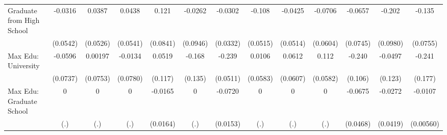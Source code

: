 {\begin{tabular}{l*{12}{c}}
\addlinespace
Graduate from High School&     -0.0316         &      0.0387         &      0.0438         &       0.121         &     -0.0262         &     -0.0302         &      -0.108\sym{*}  &     -0.0425         &     -0.0706         &     -0.0657         &      -0.202\sym{*}  &      -0.135         \\
            &    (0.0542)         &    (0.0526)         &    (0.0541)         &    (0.0841)         &    (0.0946)         &    (0.0332)         &    (0.0515)         &    (0.0514)         &    (0.0604)         &    (0.0745)         &    (0.0980)         &    (0.0755)         \\
\addlinespace
Max Edu: University&     -0.0596         &     0.00197         &     -0.0134         &      0.0519         &      -0.168         &      -0.239\sym{***}&      0.0106         &      0.0612         &       0.112         &      -0.240\sym{*}  &     -0.0497         &      -0.241         \\
            &    (0.0737)         &    (0.0753)         &    (0.0780)         &     (0.117)         &     (0.135)         &    (0.0511)         &    (0.0583)         &    (0.0607)         &    (0.0582)         &     (0.106)         &     (0.123)         &     (0.177)         \\
\addlinespace
Max Edu: Graduate School&           0         &           0         &           0         &     -0.0165         &           0         &     -0.0720\sym{***}&           0         &           0         &           0         &     -0.0675         &     -0.0272         &     -0.0107         \\
            &         (.)         &         (.)         &         (.)         &    (0.0164)         &         (.)         &    (0.0153)         &         (.)         &         (.)         &         (.)         &    (0.0468)         &    (0.0419)         &   (0.00560)         \\
\bottomrule
\end{tabular}
}
